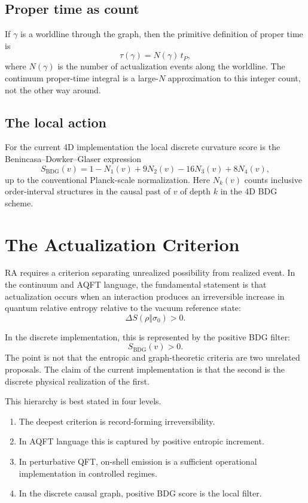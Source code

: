 \documentclass[11pt]{article}
\begin{document}
\subsection{Proper time as count}
If $\gamma$ is a worldline through the graph, then the primitive definition of proper time is
\begin{equation}
\tau(\gamma)=N(\gamma)\, t_P,
\end{equation}
where $N(\gamma)$ is the number of actualization events along the worldline. The continuum proper-time integral is a large-$N$ approximation to this integer count, not the other way around.

\subsection{The local action}
For the current 4D implementation the local discrete curvature score is the Benincasa--Dowker--Glaser expression
\begin{equation}
S_{\mathrm{BDG}}(v)=1-N_1(v)+9N_2(v)-16N_3(v)+8N_4(v),
\end{equation}
up to the conventional Planck-scale normalization. Here $N_k(v)$ counts inclusive order-interval structures in the causal past of $v$ of depth $k$ in the 4D BDG scheme.

\section{The Actualization Criterion}
RA requires a criterion separating unrealized possibility from realized event. In the continuum and AQFT language, the fundamental statement is that actualization occurs when an interaction produces an irreversible increase in quantum relative entropy relative to the vacuum reference state:
\begin{equation}
\Delta S(\rho\Vert\sigma_0)>0.
\end{equation}

In the discrete implementation, this is represented by the positive BDG filter:
\begin{equation}
S_{\mathrm{BDG}}(v)>0.
\end{equation}
The point is not that the entropic and graph-theoretic criteria are two unrelated proposals. The claim of the current implementation is that the second is the discrete physical realization of the first.

This hierarchy is best stated in four levels.
\begin{enumerate}[label=\roman*.]
    \item The deepest criterion is record-forming irreversibility.
    \item In AQFT language this is captured by positive entropic increment.
    \item In perturbative QFT, on-shell emission is a sufficient operational implementation in controlled regimes.
    \item In the discrete causal graph, positive BDG score is the local filter.
\end{enumerate}
\end{document}
